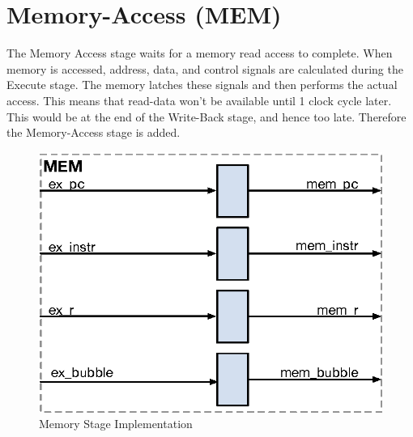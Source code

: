\pagebreak


\section{Memory-Access (MEM)}\label{memory-access-mem-1}

The Memory Access stage waits for a memory read access to complete.
When memory is accessed, address, data, and control signals are calculated during the Execute stage.
The memory latches these signals and then performs the actual access. This means that read-data won't be available until 1 clock cycle later.
This would be at the end of the Write-Back stage, and hence too late. Therefore the Memory-Access stage is added.

\begin{figure}[h]
  \includegraphics{assets/img/Pipeline-MEM}
  \caption{Memory Stage Implementation}
\end{figure}

